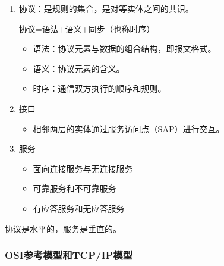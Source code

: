 \documentclass[12pt, a4paper, oneside]{ctexart}
\begin{document}
\begin{enumerate}
    \item 协议：是规则的集合，是对等实体之间的共识。
    
    协议=语法+语义+同步（也称时序）
    \begin{itemize}
        \item 语法：协议元素与数据的组合结构，即报文格式。
        \item 语义：协议元素的含义。
        \item 时序：通信双方执行的顺序和规则。
    \end{itemize}
    \item 接口
    \begin{itemize}
        \item 相邻两层的实体通过服务访问点（SAP）进行交互。
    \end{itemize}
    \item 服务
    \begin{itemize}
        \item 面向连接服务与无连接服务
        \item 可靠服务和不可靠服务
        \item 有应答服务和无应答服务
    \end{itemize}
\end{enumerate}

协议是水平的，服务是垂直的。

\subsubsection{OSI参考模型和TCP/IP模型}
\end{document}
